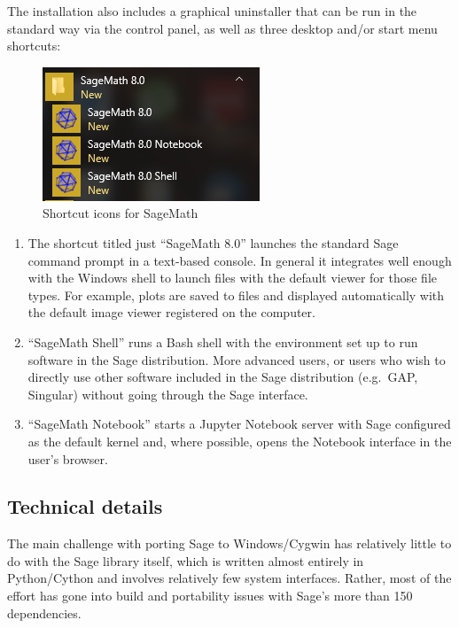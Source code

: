 The installation also includes a graphical uninstaller that can be run in the
standard way via the control panel, as well as three desktop and/or start menu
shortcuts:

\begin{figure}[h!]
    \centering
    \includegraphics{screenshots/shortcuts}
    \caption{Shortcut icons for SageMath}
    \label{fig:shortcut-icons}
\end{figure}

\begin{enumerate}
\def\labelenumi{\arabic{enumi})}
\item
  The shortcut titled just ``SageMath 8.0'' launches the standard Sage
  command prompt in a text-based console. In general it integrates well
  enough with the Windows shell to launch files with the default viewer
  for those file types. For example, plots are saved to files and
  displayed automatically with the default image viewer registered on
  the computer.
\item
  ``SageMath Shell'' runs a Bash shell with the environment set up to
  run software in the Sage distribution. More advanced users, or users
  who wish to directly use other software included in the Sage
  distribution (e.g.~GAP, Singular) without going through the Sage
  interface.
\item
  ``SageMath Notebook'' starts a Jupyter Notebook server with Sage
  configured as the default kernel and, where possible, opens the
  Notebook interface in the user's browser.
\end{enumerate}

\hypertarget{technical-details}{%
\subsection{Technical details}\label{technical-details}}

The main challenge with porting Sage to Windows/Cygwin has relatively
little to do with the Sage library itself, which is written almost
entirely in Python/Cython and involves relatively few system interfaces.
Rather, most of the effort has gone into build and portability issues
with Sage's more than 150 dependencies.

